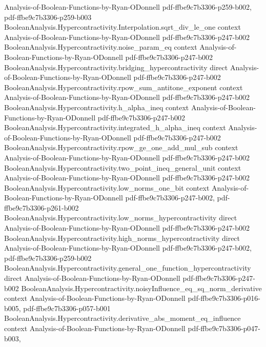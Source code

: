 \begin{theorem}
  {Analysis-of-Boolean-Functions-by-Ryan-ODonnell}
  {pdf-ffbe9c7b3306-p259-b002,
    pdf-ffbe9c7b3306-p259-b003}
\proofstep
  {BooleanAnalysis.Hypercontractivity.Interpolation.sqrt_div_le_one}
  {context}
  {Analysis-of-Boolean-Functions-by-Ryan-ODonnell}
  {pdf-ffbe9c7b3306-p247-b002}
\proofstep
  {BooleanAnalysis.Hypercontractivity.noise_param_eq}
  {context}
  {Analysis-of-Boolean-Functions-by-Ryan-ODonnell}
  {pdf-ffbe9c7b3306-p247-b002}
\proofstep
  {BooleanAnalysis.Hypercontractivity.bridging_hypercontractivity}
  {direct}
  {Analysis-of-Boolean-Functions-by-Ryan-ODonnell}
  {pdf-ffbe9c7b3306-p247-b002}
\proofstep
  {BooleanAnalysis.Hypercontractivity.rpow_sum_antitone_exponent}
  {context}
  {Analysis-of-Boolean-Functions-by-Ryan-ODonnell}
  {pdf-ffbe9c7b3306-p247-b002}
\proofstep
  {BooleanAnalysis.Hypercontractivity.h_alpha_ineq}
  {context}
  {Analysis-of-Boolean-Functions-by-Ryan-ODonnell}
  {pdf-ffbe9c7b3306-p247-b002}
\proofstep
  {BooleanAnalysis.Hypercontractivity.integrated_h_alpha_ineq}
  {context}
  {Analysis-of-Boolean-Functions-by-Ryan-ODonnell}
  {pdf-ffbe9c7b3306-p247-b002}
\proofstep
  {BooleanAnalysis.Hypercontractivity.rpow_ge_one_add_mul_sub}
  {context}
  {Analysis-of-Boolean-Functions-by-Ryan-ODonnell}
  {pdf-ffbe9c7b3306-p247-b002}
\proofstep
  {BooleanAnalysis.Hypercontractivity.two_point_ineq_general_unit}
  {context}
  {Analysis-of-Boolean-Functions-by-Ryan-ODonnell}
  {pdf-ffbe9c7b3306-p247-b002}
\proofstep
  {BooleanAnalysis.Hypercontractivity.low_norms_one_bit}
  {context}
  {Analysis-of-Boolean-Functions-by-Ryan-ODonnell}
  {pdf-ffbe9c7b3306-p247-b002,
    pdf-ffbe9c7b3306-p261-b002}
\proofstep
  {BooleanAnalysis.Hypercontractivity.low_norms_hypercontractivity}
  {direct}
  {Analysis-of-Boolean-Functions-by-Ryan-ODonnell}
  {pdf-ffbe9c7b3306-p247-b002}
\proofstep
  {BooleanAnalysis.Hypercontractivity.high_norms_hypercontractivity}
  {direct}
  {Analysis-of-Boolean-Functions-by-Ryan-ODonnell}
  {pdf-ffbe9c7b3306-p247-b002,
    pdf-ffbe9c7b3306-p259-b002}
\proofstep
  {BooleanAnalysis.Hypercontractivity.general_one_function_hypercontractivity}
  {direct}
  {Analysis-of-Boolean-Functions-by-Ryan-ODonnell}
  {pdf-ffbe9c7b3306-p247-b002}
\proofstep
  {BooleanAnalysis.Hypercontractivity.noisyInfluence_eq_sq_norm_derivative}
  {context}
  {Analysis-of-Boolean-Functions-by-Ryan-ODonnell}
  {pdf-ffbe9c7b3306-p016-b005,
    pdf-ffbe9c7b3306-p057-b001}
\proofstep
  {BooleanAnalysis.Hypercontractivity.derivative_abs_moment_eq_influence}
  {context}
  {Analysis-of-Boolean-Functions-by-Ryan-ODonnell}
  {pdf-ffbe9c7b3306-p047-b003,
}
\end{theorem}
